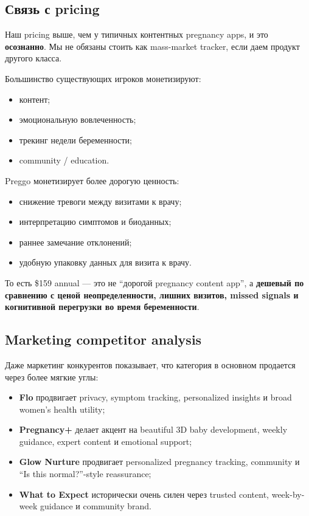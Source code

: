 \documentclass[10pt,a4paper]{article}
\begin{document}
\subsection{Связь с pricing}

Наш pricing выше, чем у типичных контентных pregnancy apps, и это \textbf{осознанно}. Мы не обязаны стоить как mass-market tracker, если даем продукт другого класса.

\begin{orangebox}
Большинство существующих игроков монетизируют:
\begin{itemize}
    \item контент;
    \item эмоциональную вовлеченность;
    \item трекинг недели беременности;
    \item community / education.
\end{itemize}

Preggo монетизирует более дорогую ценность:
\begin{itemize}
    \item снижение тревоги между визитами к врачу;
    \item интерпретацию симптомов и биоданных;
    \item раннее замечание отклонений;
    \item удобную упаковку данных для визита к врачу.
\end{itemize}

То есть \$159 annual --- это не ``дорогой pregnancy content app'', а \textbf{дешевый по сравнению с ценой неопределенности, лишних визитов, missed signals и когнитивной перегрузки во время беременности}.
\end{orangebox}

\subsection{Marketing competitor analysis}

Даже маркетинг конкурентов показывает, что категория в основном продается через более мягкие углы:

\begin{itemize}
    \item \textbf{Flo} продвигает privacy, symptom tracking, personalized insights и broad women’s health utility;
    \item \textbf{Pregnancy+} делает акцент на beautiful 3D baby development, weekly guidance, expert content и emotional support;
    \item \textbf{Glow Nurture} продвигает personalized pregnancy tracking, community и ``Is this normal?''-style reassurance;
    \item \textbf{What to Expect} исторически очень силен через trusted content, week-by-week guidance и community brand.
\end{itemize}
\end{document}
